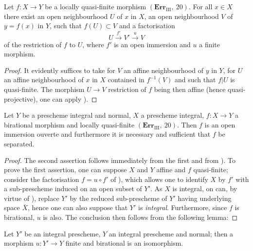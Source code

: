 
\begin{corollary}[8.12.9]
\label{IV.8.12.9}
Let $f:X\to Y$ be a locally quasi-finite morphism $(\mathbf{Err}_{\text{III}},~20)$.
For all $x\in X$ there exist an open neighbourhood $U$ of $x$ in $X$, an open neighbourhood $V$ of $y=f(x)$ in $Y$, such that $f(U)\subset V$ and a factorisation
\[
U\xrightarrow{f'}V'\xrightarrow{u}V
\]
of the restriction of $f$ to $U$, where $f'$ is an open immersion and $u$ a finite morphism.
\end{corollary}

\begin{proof}
It evidently suffices to take for $V$ an affine neighbourhood of $y$ in $Y$, for $U$ an affine neighbourhood of $x$ in $X$ contained in $f^{-1}(V)$ and such that $f|U$ is quasi-finite.
The morphism $U\to V$ restriction of $f$ being then affine (hence quasi-projective), one can apply ).
\end{proof}

\begin{corollary}[8.12.10]
\label{IV.8.12.10}
Let $Y$ be a prescheme integral and normal, $X$ a prescheme integral, $f:X\to Y$ a birational morphism and locally quasi-finite $(\mathbf{Err}_{\text{III}},~20)$.
Then $f$ is an open immersion ouverte and furthermore it is necessary and sufficient that $f$ be separated.
\end{corollary}

\begin{proof}
The second assertion follows immediately from the first and from ).
To prove the first assertion, one can suppose $X$ and $Y$ affine and $f$ quasi-finite; consider the factorisation $f=u\circ f'$ of ), which allows one to identify $X$ by $f'$ with a sub-prescheme induced on an open subset of $Y'$.
As $X$ is integral, on can, by virtue of ), replace $Y'$ by the reduced sub-prescheme of $Y'$ having underlying space $\overline{X}$, hence one can also suppose that $Y'$ is \emph{integral}.
Furthermore, since $f$ is birational, $u$ is also.
The conclusion then follows from the following lemma:
\end{proof}

\begin{lemma}[8.12.10.1]
\label{IV.8.12.10.1}
Let $Y'$ be an integral prescheme, $Y$ an integral prescheme and normal; then a morphism $u:Y'\to Y$ finite and birational is an isomorphism.
\end{lemma}

